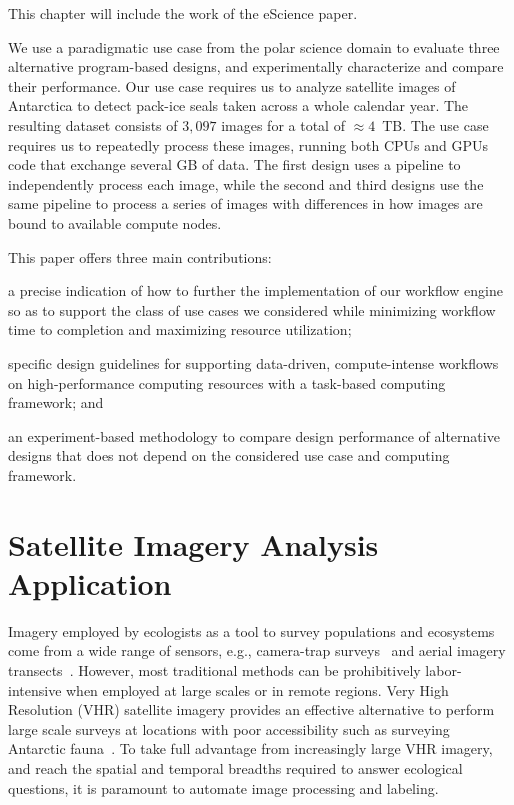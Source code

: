 \label{designs}

This chapter will include the work of the eScience paper.

We use a paradigmatic use case from the polar science domain to evaluate three alternative program-based designs, and experimentally characterize and compare their performance.
Our use case requires us to analyze satellite images of Antarctica to detect pack-ice seals taken across a whole calendar year.
The resulting dataset consists of $3,097$ images for a total of $\approx4$~TB.
The use case requires us to repeatedly process these images, running both CPUs and GPUs code that exchange several GB of data.
The first design uses a pipeline to independently process each image, while the second and third designs use the same pipeline to process a series of images with differences in how images are bound to available compute nodes.

This paper offers three main contributions: 
\begin{inparaenum}[(1)]
    \item a precise indication of how to further the implementation of our workflow engine so as to support the class of use cases we considered while minimizing workflow time to completion and maximizing resource utilization;
    \item specific design guidelines for supporting data-driven, compute-intense workflows on high-performance computing resources with a task-based computing framework; and
    \item an experiment-based methodology to compare design performance of alternative designs that does not depend on the considered use case and computing framework.
\end{inparaenum}

\section{Satellite Imagery Analysis Application}\label{sec:ucase}
Imagery employed by ecologists as a tool to survey populations and ecosystems come from a wide range of sensors, e.g., camera-trap surveys~\cite{karanth1995estimating} and aerial imagery transects~\cite{western2009impact}.
However, most traditional methods can be prohibitively labor-intensive when employed at large scales or in remote regions.
Very High Resolution (VHR) satellite imagery provides an effective alternative to perform large scale surveys at locations with poor accessibility such as surveying Antarctic fauna~\cite{lynch2012detection}.
To take full advantage from increasingly large VHR imagery, and reach the spatial and temporal breadths required to answer ecological questions, it is paramount to automate image processing and labeling.

